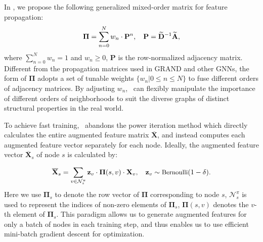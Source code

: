  In \model, we propose the following generalized mixed-order matrix for feature propagation:
\begin{equation}
\small
\label{equ:prop}
\mathbf{\Pi} = \sum_{n=0}^{N} w_n \cdot\mathbf{P}^n, \quad \mathbf{P} = \widetilde{\mathbf{D}}^{-1}\widetilde{\mathbf{A}},
\end{equation}
where $\sum_{n=0}^Nw_n=1$ and $w_n \geq 0$, $\mathbf{P}$ is the row-normalized adjacency matrix.
Different from the propagation matrices used in GRAND and other GNNs, the form of $\mathbf{\Pi}$ adopts a set of tunable weights $\{w_n|0\leq n \leq N\}$ to fuse different orders of adjacency matrices. 
By adjusting $w_n$, \model\ can {flexibly} manipulate the importance of different orders of neighborhoods to suit the diverse graphs of distinct structural properties in the real world. 

To achieve fast training, \model\ abandons the power iteration method which directly calculates the entire augmented feature matrix $\overline{\mathbf{X}}$, and instead computes each augmented feature vector separately for each node. 
Ideally, the augmented feature vector $\overline{\mathbf{X}}_s$ of node $s$ is  calculated by:


\begin{equation}
	\label{equ:mini}
\small
    \overline{\mathbf{X}}_{s} = \sum_{v \in \mathcal{N}^{\pi}_s} \mathbf{z}_v \cdot \mathbf{\Pi}{(s,v)} \cdot \mathbf{X}_v, \quad \mathbf{z}_v \sim \text{Bernoulli}(1-\delta).
\end{equation}
Here we use $\mathbf{\Pi}_s$ to denote the row vector of $\mathbf{\Pi}$ corresponding to node $s$, $\mathcal{N}^{\pi}_s$ is used to represent the indices of non-zero elements of $\mathbf{\Pi}_s$, $\mathbf{\Pi}{(s,v)}$ denotes the $v$-th element of $\mathbf{\Pi}_s$. 
This paradigm allows us to generate augmented features for only a batch of nodes in each training step, and thus enables us to use efficient mini-batch gradient descent for optimization. 

